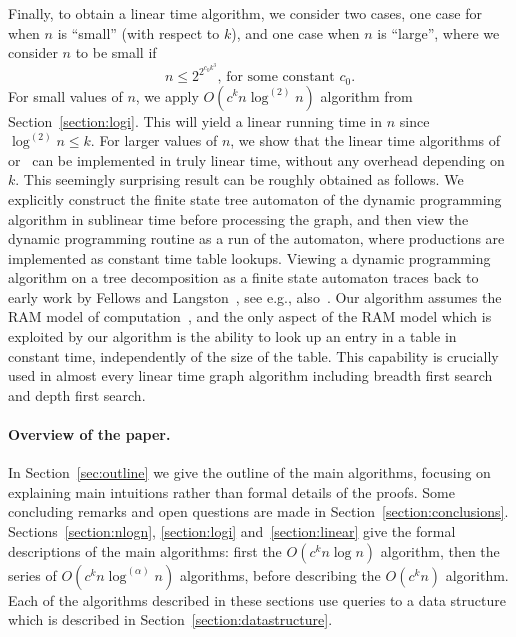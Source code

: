 \documentclass[a4paper,11pt]{article}
\theoremstyle{definition}
\theoremstyle{remark}
\newcommand{\depth}{\alpha}
\begin{document}
Finally, to obtain a linear time algorithm, we consider two cases, one
case for when $n$ is ``small'' (with respect to $k$), and one case
when $n$ is ``large'', where we consider $n$ to be small if
\[
n \leq 2^{2^{c_0 k^3}} \textrm{, for some constant $c_0$.}
\]
For small values of $n$, we apply $O(c^k n \log^{(2)} n)$ algorithm
from Section~\ref{section:logi}.  This will yield a linear running
time in $n$ since $\log^{(2)}n \leq k$.  For larger values of $n$, we
show that the linear time algorithms of~\cite{Bodlaender96}
or~\cite{PerkovicR00} can be implemented in truly linear time, without any overhead depending on $k$. This seemingly surprising result can be roughly obtained as follows. 
We explicitly construct the finite state tree automaton of the dynamic
programming algorithm in sublinear time before processing the graph, and then view the dynamic programming routine as a run of the automaton, where productions are implemented as constant time table lookups. Viewing a dynamic programming algorithm on a tree decomposition as a finite state automaton traces
back to early work by Fellows and Langston~\cite{FellowsL89}, see e.g., also~\cite{AbrahamsonF93}. Our algorithm assumes the RAM model of computation~\cite{SavageBook}, and the only aspect of the RAM model which is exploited by our algorithm is the ability to look up an entry in a table in constant time, independently of the size of the table. This capability is crucially used in almost every linear time graph algorithm including breadth first search and depth first search.






\paragraph{Overview of the paper.}
In Section~\ref{sec:outline} we give the outline of the main algorithms, focusing on explaining main intuitions rather than formal details of the proofs.
Some concluding remarks and open questions are made in Section~\ref{section:conclusions}. 
Sections~\ref{section:nlogn}, \ref{section:logi}
and~\ref{section:linear} give the formal descriptions of the main algorithms: first the $O(c^k n
\log n)$ algorithm, then the series of $O(c^k n \log^{(\depth)} n)$
algorithms, before describing the $O(c^k n)$ algorithm.  Each of the
algorithms described in these sections use queries to a data structure
which is described in Section~\ref{section:datastructure}.
\end{document}
